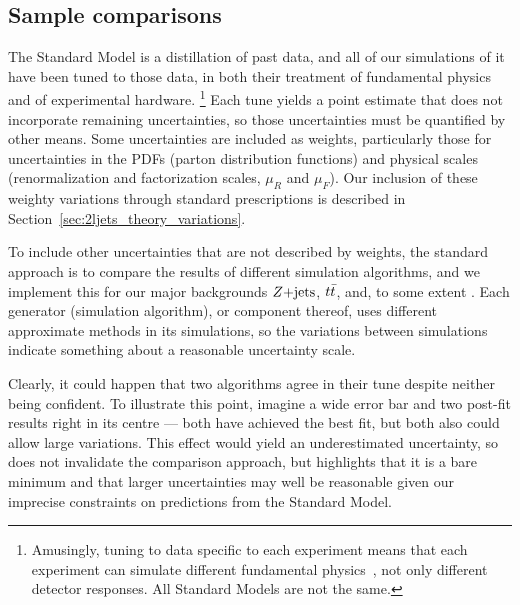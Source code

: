 \subsection{Sample comparisons}
\label{sec:2ljets_sample_comparisons}
The Standard Model is a distillation of past data, and all of our simulations
of it have been tuned to those data, in both their treatment of fundamental
physics and of experimental hardware.%
\footnote{%
Amusingly, tuning to data specific to each experiment means that each
experiment can simulate different fundamental physics~\cite{
herwig2000parameter,
Altarelli:473529
}, not only different detector responses.
All Standard Models are not the same.
}
Each tune yields a point estimate that does not incorporate remaining
uncertainties, so those uncertainties must be quantified by other means.
Some uncertainties are included as weights, particularly those for
uncertainties in the
PDFs (parton distribution functions) and physical scales
(renormalization and factorization scales, $\mu_R$ and $\mu_F$).
Our inclusion of these weighty variations through standard prescriptions is
described in Section~\ref{sec:2ljets_theory_variations}.

To include other uncertainties that are not described by weights,
the standard approach is to compare the results of different simulation
algorithms, and we implement this for our major backgrounds $Z\mathrm{+jets}$, $t\bar t$,
and, to some extent \diboson.
Each generator (simulation algorithm), or component thereof, uses different
approximate methods in its simulations, so the variations between simulations
indicate something about a reasonable uncertainty scale.

Clearly, it could happen that two algorithms agree in their tune despite
neither being confident.
To illustrate this point, imagine a wide error bar and
two post-fit results right in its centre ---
both have achieved the best fit, but both also could allow large variations.
This effect would yield an underestimated uncertainty, so does not invalidate
the comparison approach, but highlights that it is a bare minimum and that
larger uncertainties may well be reasonable given our imprecise constraints on
predictions from the Standard Model.


